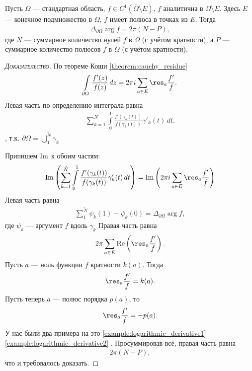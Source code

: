 \documentclass[../complex-analysis.tex]{subfiles}
\begin{document}
\begin{thm}
 Пусть $ \Omega $ --- стандартная область, $ f \in C^{1}(\overline \Omega \setminus E) $, $ f $ аналитична в $ \Omega \setminus E $. Здесь $ E $ --- конечное подмножество в $ \Omega $, $ f $ имеет полюса в точках из $ E $. Тогда
 \begin{align*}
  \Delta_{\partial \Omega} \arg f = 2\pi(N - P),
 \end{align*} где $ N $ --- суммарное количество нулей $ f $ в $ \Omega $ (с учётом кратности), а $ P $ --- суммарное количество  полюсов $ f $ в $ \Omega $ (с учётом кратности).
\end{thm}
\begin{proof}[\normalfont\textsc{Доказательство}]
По теореме Коши \eqref{theorem:cauchy_residue}
 \begin{align*}
  \int\limits_{\partial\Omega} \frac{f'(z)}{f(z)} \,dz = 2\pi i \sum_{a \in E} \res_a \frac{f'}{f}.
 \end{align*} Левая часть по определению интеграла равна
 \begin{align*}
  \sum_{k=1}^{\tilde N} \int\limits_{0}^{1} \frac{f'(\gamma_k(t))}{f(\gamma_k(t))}\gamma'_k(t)\,dt.
\end{align*}, т.к. $\partial \Omega = \bigcup_{1}^{\tilde N} \gamma_k$ 

 Припишем $ \operatorname{Im}$ к обоим частям:
 \begin{align*}
  \Imaginary \left(\sum_{k=1}^{\tilde N} \int\limits_{0}^{1} \frac{f'(\gamma_k(t))}{f(\gamma_k(t))}\gamma'_k(t)\,dt\right) = \Imaginary \left( 2\pi i \sum_{a \in E}\res_a \frac{f'}{f} \right)
 \end{align*} Левая часть равна
 \begin{align*}
  \sum_{1}^{\tilde N} \psi_k(1) - \psi_k(0) = \Delta_{\partial \Omega} \arg f,
 \end{align*} где $ \psi_k $ --- аргумент $ f $ вдоль $ \gamma_k $ Правая часть равна
 \begin{align*}
  2\pi \sum_{a \in E} \Real \left( \res_a \frac{f'}{f} \right).
 \end{align*} Пусть $ a $ --- ноль функции $ f $ кратности $ k(a) $. Тогда
 \begin{align*}
  \res_a \frac{f'}{f} = k(a).
 \end{align*} Пусть теперь $ a $ --- полюс порядка $ p(a) $, то
 \begin{align*}
  \res_a \frac{f'}{f} = -p(a).
\end{align*} У нас были два примера на это \eqref{example:logarithmic_derivative1} \eqref{example:logarithmic_derivative2} . Просуммировав всё, правая часть равна
 \begin{align*}
  2\pi (N-P),
 \end{align*} что и требовалось доказать.
\end{proof}
\end{document}
